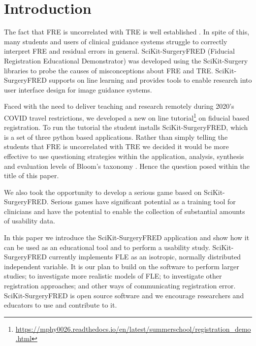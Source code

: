 \section{Introduction}
The fact that \gls{FRE} is uncorrelated with \gls{TRE} is well established 
\cite{fitzpatrick2009}. In spite of this, many students and users of clinical guidance systems struggle to 
correctly interpret \gls{FRE} and residual errors in general. 
SciKit-SurgeryFRED (Fiducial Registration Educational Demonstrator)
 \cite{stephen_thompson_2020_3946090} was developed using the 
SciKit-Surgery \cite{PMID:32436132} libraries to probe the causes of misconceptions 
about \gls{FRE} and \gls{TRE}. SciKit-SurgeryFRED supports on line learning and provides tools to enable 
research into user interface design for image guidance systems. 

Faced with the need to deliver teaching and research remotely during 2020's {COVID} travel restrictions, we 
developed a new on line tutorial\footnote{\url{https://mphy0026.readthedocs.io/en/latest/summerschool/registration_demo.html}}
on fiducial based registration. To run the tutorial the student installs SciKit-SurgeryFRED, which is a 
set of three python based applications. Rather than simply telling the students that \gls{FRE} is uncorrelated with \gls{TRE} 
we decided it would be more effective to use questioning strategies within the application, analysis, synthesis and 
evaluation levels of Bloom's taxonomy \cite{blooms_tax}. Hence the question posed within the title of this paper. 

We also took the opportunity to develop a serious game based on SciKit-SurgeryFRED. Serious games have significant potential 
as a training tool for clinicians \cite{PMID:28133947} and have the potential to enable the collection of substantial amounts of 
usability data. 

In this paper we introduce the SciKit-SurgeryFRED application and show how it can
be used as an educational tool and to perform a usability study. SciKit-SurgeryFRED 
currently implements \gls{FLE} as an isotropic, normally distributed independent variable. 
It is our plan to build on 
the software to perform larger studies; to investigate more realistic models of \gls{FLE};
to investigate other registration approaches; and other ways of communicating registration error. 
SciKit-SurgeryFRED is open 
source software and we encourage researchers and educators to use and contribute to it. 

